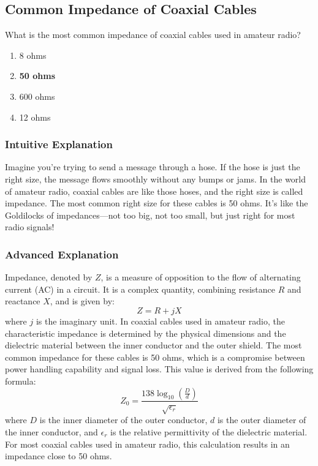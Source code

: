 \subsection{Common Impedance of Coaxial Cables}
\label{T9B02}

\begin{tcolorbox}[colback=gray!10!white,colframe=black!75!black,title=T9B02]
What is the most common impedance of coaxial cables used in amateur radio?
\begin{enumerate}[label=\Alph*)]
    \item 8 ohms
    \item \textbf{50 ohms}
    \item 600 ohms
    \item 12 ohms
\end{enumerate}
\end{tcolorbox}

\subsubsection{Intuitive Explanation}
Imagine you're trying to send a message through a hose. If the hose is just the right size, the message flows smoothly without any bumps or jams. In the world of amateur radio, coaxial cables are like those hoses, and the right size is called impedance. The most common right size for these cables is 50 ohms. It's like the Goldilocks of impedances—not too big, not too small, but just right for most radio signals!

\subsubsection{Advanced Explanation}
Impedance, denoted by \( Z \), is a measure of opposition to the flow of alternating current (AC) in a circuit. It is a complex quantity, combining resistance \( R \) and reactance \( X \), and is given by:
\[
Z = R + jX
\]
where \( j \) is the imaginary unit. In coaxial cables used in amateur radio, the characteristic impedance is determined by the physical dimensions and the dielectric material between the inner conductor and the outer shield. The most common impedance for these cables is 50 ohms, which is a compromise between power handling capability and signal loss. This value is derived from the following formula:
\[
Z_0 = \frac{138 \log_{10}(\frac{D}{d})}{\sqrt{\epsilon_r}}
\]
where \( D \) is the inner diameter of the outer conductor, \( d \) is the outer diameter of the inner conductor, and \( \epsilon_r \) is the relative permittivity of the dielectric material. For most coaxial cables used in amateur radio, this calculation results in an impedance close to 50 ohms.

